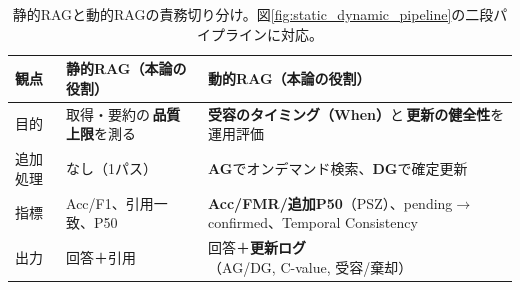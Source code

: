 \documentclass[ja=standard,xelatex]{bxjsarticle}
\begin{document}
\begin{table}[H]
  \centering
  \scriptsize
  \begin{tabular}{p{22mm}p{54mm}p{54mm}}
    \toprule
    観点 & 静的RAG（本論の役割） & 動的RAG（本論の役割） \\
    \midrule
    目的 & 取得・要約の\,\textbf{品質上限}を測る & \textbf{受容のタイミング（When）}と\,\textbf{更新の健全性}を運用評価 \\
    追加処理 & なし（1パス） & \textbf{AG}でオンデマンド検索、\textbf{DG}で確定更新 \\
    指標 & Acc/F1、引用一致、P50 & \textbf{Acc/FMR/追加P50}（PSZ）、pending$\to$confirmed、Temporal Consistency \\
    出力 & 回答＋引用 & 回答＋\textbf{更新ログ}（AG/DG, C-value, 受容/棄却） \\
    \bottomrule
  \end{tabular}
  \caption{静的RAGと動的RAGの責務切り分け。図\ref{fig:static_dynamic_pipeline}の二段パイプラインに対応。}
  \label{tab:static_dynamic_responsibility}
\end{table}
\end{document}
